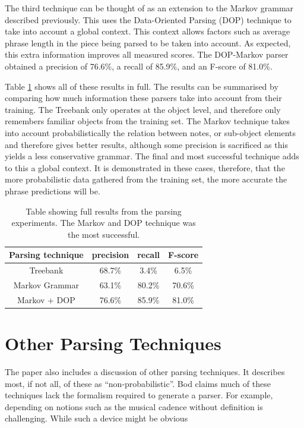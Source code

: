 \documentclass[a4paper,12pt]{article}
\begin{document}
The third technique can be thought of as an extension to the Markov grammar described previously. This uses the Data-Oriented Parsing (DOP) technique to take into account a global context. This context allows factors such as average phrase length in the piece being parsed to be taken into account. As expected, this extra information improves all measured scores. The DOP-Markov parser obtained a precision of 76.6\%, a recall of 85.9\%, and an F-score of 81.0\%. 

Table \ref{resulttab} shows all of these results in full. The results can be summarised by comparing how much information these parsers take into account from their training. The Treebank only operates at the object level, and therefore only remembers familiar objects from the training set. The Markov technique takes into account probabilistically the relation between notes, or sub-object elements and therefore gives better results, although some precision is sacrificed as this yields a less conservative grammar. The final and most successful technique adds to this a global context. It is demonstrated in these cases, therefore, that the more probabilistic data gathered from the training set, the more accurate the phrase predictions will be.

\begin{table}
\centering
\begin{tabular}{ |c|c|c|c| } 
 \hline
 Parsing technique & precision & recall & F-score \\ 
 \hline
 Treebank & 68.7\% & 3.4\% & 6.5\% \\ 
 Markov Grammar & 63.1\% & 80.2\% & 70.6\% \\ 
 Markov + DOP & 76.6\% & 85.9\% & 81.0\% \\ 

 \hline
\end{tabular}
\caption{Table showing full results from the parsing experiments. The Markov and DOP technique was the most successful.}
\label{resulttab}
\end{table}

\section{Other Parsing Techniques}

The paper \cite{Bod_probabilisticgrammars} also includes a discussion of other parsing techniques. It describes most, if not all, of these as ``non-probabilistic''. Bod claims much of these techniques lack the formalism required to generate a parser. For example, depending on notions such as the musical cadence without definition is challenging. While such a device might be obvious 
\end{document}
